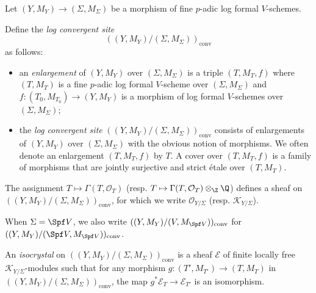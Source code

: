 Let $(Y,M_Y)\rightarrow (\Sigma,M_\Sigma)$ be a morphism of fine $p$-adic log formal $V$-schemes.

\begin{defn}
Define the \emph{log convergent site}
\[
((Y, M_Y)/(\Sigma,M_\Sigma))_{\mathrm{conv}}
\]
as follows:
\begin{itemize}
   \item an \textit{enlargement} of $(Y, M_Y)$ over $(\Sigma, M_{\Sigma})$ is a triple $(T, M_T, f)$ where $(T, M_T)$ is a fine $p$-adic log formal $V$-scheme over $(\Sigma, M_{\Sigma})$ and $f\colon (T_0, M_{T_0}) \rightarrow (Y, M_Y)$ is a morphism of log formal $V$-schemes over $(\Sigma, M_{\Sigma})$;
    \item the \textit{log convergent site} $((Y, M_Y)/(\Sigma,M_\Sigma))_{\mathrm{conv}}$ consists of enlargements of 
    $(Y, M_Y)$ over $(\Sigma, M_{\Sigma})$ with the obvious notion of morphisms. We often denote an enlargement $(T,M_T,f)$ by $T$.
    A cover over $(T,M_T,f)$ is a family of morphisms that are jointly surjective and strict \'etale over $(T,M_T)$.
\end{itemize}
The assignment $T \mapsto \Gamma(T, \mathcal{O}_T)$ (resp. $T \mapsto  \Gamma(T, \mathcal{O}_T)\otimes_\Z\Q$) defines a sheaf on $((Y, M_Y)/(\Sigma,M_\Sigma))_{\mathrm{conv}}$, for which we write $\mathcal{O}_{Y/\Sigma}$ (resp. $\mathcal{K}_{Y/\Sigma}$).

When $\Sigma=\Spf V$, we also write $((Y, M_Y)/(V,M_{\Spf V}))_{\mathrm{conv}}$ for $((Y, M_Y)/(\Spf V,M_{\Spf V}))_{\mathrm{conv}}$.
\end{defn}

\begin{defn}
An \emph{isocrystal} on $((Y, M_Y)/(\Sigma,M_\Sigma))_{\mathrm{conv}}$ is a sheaf $\mathcal{E}$ of finite locally free $\mathcal{K}_{Y/\Sigma}$-modules such that for any morphism $g\colon (T', M_{T'}) \rightarrow (T, M_T)$ in $((Y, M_Y)/(\Sigma,M_\Sigma))_{\mathrm{conv}}$, the map $g^* \mathcal{E}_T \rightarrow \mathcal{E}_{T'}$ is an isomorphism.   
\end{defn}


